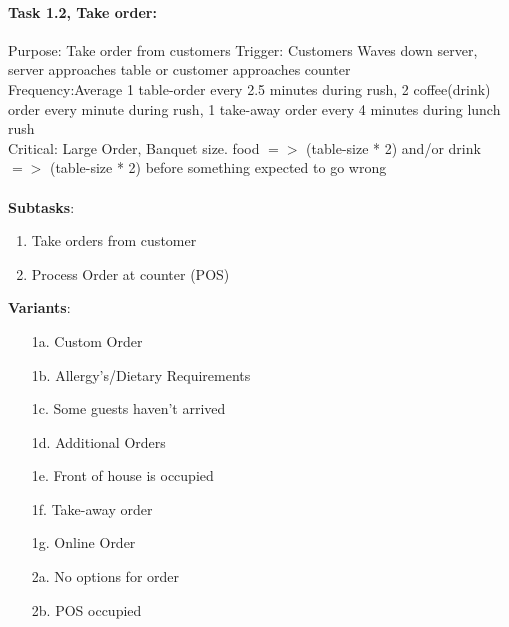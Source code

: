 \documentclass{article}
\begin{document}
\paragraph{Task 1.2, Take order:}
Purpose: Take order from customers
Trigger: Customers Waves down server, server approaches table or customer approaches counter\\
Frequency:Average 1 table-order every 2.5 minutes during rush, 2 coffee(drink) order every minute during rush, 1 take-away order  every 4 minutes during lunch rush \\
Critical: Large Order, Banquet size. food $=>$ (table-size * 2) and/or drink $=>$ (table-size * 2) before something expected to go wrong\\
\\
\textbf{Subtasks}:
\begin{enumerate}
    \item Take orders from customer
    \item Process Order at counter (POS)
\end{enumerate}
\textbf{Variants}:
\begin{enumerate}
    \item [1a.] Custom Order
    \item [1b.] Allergy's/Dietary Requirements
    \item [1c.] Some guests haven't arrived
    \item [1d.] Additional Orders
    \item [1e.] Front of house is occupied
    \item [1f.] Take-away order
    \item [1g.] Online Order
    \item [2a.] No options for order
    \item [2b.] POS occupied
\end{enumerate}
\end{document}
